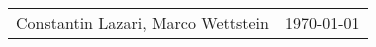 \documentclass[12pt, a4paper, answers]{exam} %
\newcommand{\myAuthor}{Constantin Lazari, Marco Wettstein}
\begin{document}
	\begin{tabularx}{\textwidth}{Xr}
	\myAuthor & \today\\
	\end{tabularx}
	\begin{questions}
	
	
	
	\end{questions}
\end{document}
